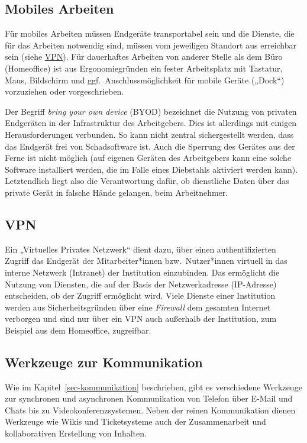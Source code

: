 \documentclass[
  11pt,
  letterpaper,
  DIV=11,
  twoside]{scrreprt}
\begin{document}
\subsection{Mobiles Arbeiten}\label{mobiles-arbeiten}

Für mobiles Arbeiten müssen Endgeräte transportabel sein und die
Dienste, die für das Arbeiten notwendig sind, müssen vom jeweiligen
Standort aus erreichbar sein (siehe \hyperref[vpn]{VPN}). Für
dauerhaftes Arbeiten von anderer Stelle als dem Büro (Homeoffice) ist
aus Ergonomiegründen ein fester Arbeitsplatz mit Tastatur, Maus,
Bildschirm und ggf.~Anschlussmöglichkeit für mobile Geräte („Dock``)
vorzuziehen oder vorgeschrieben.

Der Begriff \emph{bring your own device} (BYOD) bezeichnet die Nutzung
von privaten Endgeräten in der Infrastruktur des Arbeitgebers. Dies ist
allerdings mit einigen Herausforderungen verbunden. So kann nicht
zentral sichergestellt werden, dass das Endgerät frei von Schadsoftware
ist. Auch die Sperrung des Gerätes aus der Ferne ist nicht möglich (auf
eigenen Geräten des Arbeitgebers kann eine solche Software installiert
werden, die im Falle eines Diebstahls aktiviert werden kann).
Letztendlich liegt also die Verantwortung dafür, ob dienstliche Daten
über das private Gerät in falsche Hände gelangen, beim Arbeitnehmer.

\subsection{VPN}\label{vpn}

Ein „Virtuelles Privates Netzwerk`` dient dazu, über einen
authentifizierten Zugriff das Endgerät der Mitarbeiter*innen
bzw.~Nutzer*innen virtuell in das interne Netzwerk (Intranet) der
Institution einzubinden. Das ermöglicht die Nutzung von Diensten, die
auf der Basis der Netzwerkadresse (IP-Adresse) entscheiden, ob der
Zugriff ermöglicht wird. Viele Dienste einer Institution werden aus
Sicherheitsgründen über eine \emph{Firewall} dem gesamten Internet
verborgen und sind nur über ein VPN auch außerhalb der Institution, zum
Beispiel aus dem Homeoffice, zugreifbar.

\subsection{Werkzeuge zur
Kommunikation}\label{werkzeuge-zur-kommunikation}

Wie im Kapitel~\ref{sec-kommunikation} beschrieben, gibt es verschiedene
Werkzeuge zur synchronen und asynchronen Kommunikation von Telefon über
E-Mail und Chats bis zu Videokonferenzsystemen. Neben der reinen
Kommunikation dienen Werkzeuge wie Wikis und Ticketsysteme auch der
Zusammenarbeit und kollaborativen Erstellung von Inhalten.
\end{document}
